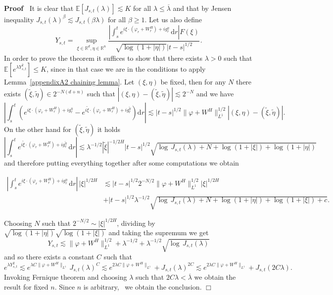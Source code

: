 \documentclass[10pt]{article}
\newcommand{\mathd}{\mathrm{d}}
\newenvironment{proof}{\noindent\textbf{Proof\ }}{\hspace*{\fill}$\Box$\medskip}
\begin{document}
\begin{proof}
  It is clear that $\mathbb{E} [J_{s, t} (\lambda)] \lesssim K$ for all
  $\lambda \leqslant \overline{\lambda}$ and that by Jensen inequality $J_{s,
  t} (\lambda)^{\beta} \lesssim J_{s, t} (\beta \lambda)$ for all $\beta
  \geqslant 1$. Let us also define
  \[ Y_{s, t} = \sup_{\xi \in \mathbb{R}^d, \eta \in \mathbb{R}^n}
     \frac{\left| \int_s^t e^{i \xi \cdot (\varphi_r + W^H_r) + i g^{\eta}_r}
     \, \mathd r \right| F (\xi)}{\sqrt{\log (1 + | \eta |)} | t - s |^{1 /
     2}}_{} . \]
  In order to prove the theorem it suffices to show that there exists $\lambda
  > 0$ such that $\mathbb{E} [e^{\lambda Y_{s, t}^2}] \leqslant K$, since in
  that case we are in the conditions to apply Lemma~\ref{appendixA2 chaining
  lemma}. Let $(\xi, \eta)$ be fixed, then for any $N$ there exists
  $(\tilde{\xi}, \tilde{\eta}) \in 2^{- N (d + n)}$ such that $| (\xi, \eta) -
  (\tilde{\xi}, \tilde{\eta}) | \lesssim 2^{- N}$ and we have
  \[ \left| \int_s^t (e^{i \xi \cdot (\varphi_r + W^H_r) + i g^{\eta}_r} -
     e^{i \tilde{\xi} \cdot (\varphi_r + W^H_r) + i g^{\tilde{\eta}}_r})
     \mathd r \right| \lesssim | t - s |^{1 / 2} \| \varphi + W^H \|^{1 /
     2}_{L^1} | (\xi, \eta) - (\tilde{\xi}, \tilde{\eta}) | . \]
  On the other hand for $(\tilde{\xi}, \tilde{\eta})$ it holds
  \[ \left| \int_s^t e^{i \tilde{\xi} \cdot (\varphi_r + W^H_r) + i
     g^{\tilde{\eta}}_r} \, \mathd r \right| \lesssim \lambda^{- 1 / 2} |
     \tilde{\xi} |^{- 1 / 2 H} | t - s |^{1 / 2} \sqrt{\log \, J_{s, t}
     (\lambda) + N + \log (1 + | \xi |) + \log (1 + | \eta |)} \]
  and therefore putting everything together after some computations we obtain
  
  \begin{align}
    \left| \int_s^t e^{i \xi \cdot (\varphi_r + W^H_r) + i g^{\eta}_r} \,
    \mathd r \right| \, | \xi |^{1 / 2 H} & \lesssim | t - s |^{1 / 2} 2^{- N
    / 2} \| \varphi + W^H \|^{1 / 2}_{L^1} | \xi |^{1 / 2 H}\\
    & + | t - s |^{1 / 2} \lambda^{- 1 / 2} \sqrt{\log \, J_{s, t} (\lambda)
    + N + \log (1 + | \eta |) + \log (1 + | \xi |) + c} .
  \end{align}
  
  Choosing $N$ such that $2^{- N / 2} \sim | \xi |^{1 / 2 H}$, dividing by
  $\sqrt{\log (1 + | \eta |)}  \sqrt{\log (1 + | \xi |)}$ and taking the
  supremum we get
  \[ Y_{s, t} \lesssim \| \varphi + W^H \|^{1 / 2}_{L^1} + \lambda^{- 1 / 2} +
     \lambda^{- 1 / 2} \sqrt{\log \, J_{s, t} (\lambda)} \]
  and so there exists a constant $C$ such that
  \[ e^{\lambda Y_{s, t}^2} \lesssim e^{\lambda C \| \varphi + W^H \|_{L^1}}
     \, J_{s, t} (\lambda)^C \lesssim e^{2 \lambda C \| \varphi + W^H
     \|_{L^1}} + J_{s, t} (\lambda)^{2 C} \lesssim e^{2 \lambda C \| \varphi +
     W^H \|_{L^1}} + J_{s, t} (2 C \lambda) . \]
  Invoking Fernique theorem and choosing $\lambda$ such that $2 C \lambda <
  \overline{\lambda}$ we obtain the result for fixed $n$. Since $n$ is
  arbitrary, \ we obtain the conclusion. 
\end{proof}
\end{document}
